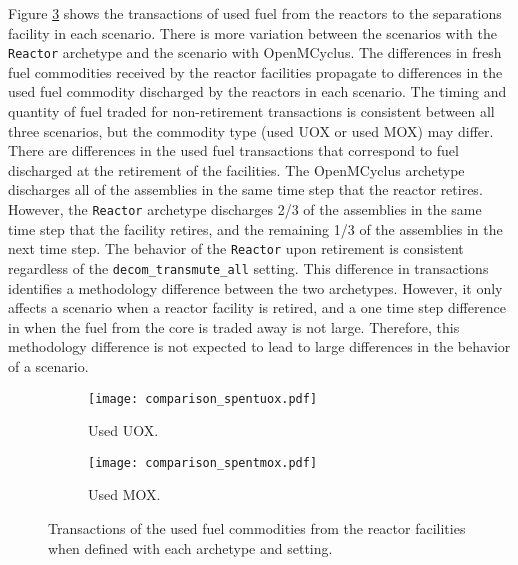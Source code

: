 Figure \ref{fig:comparison_spentfuel} shows the transactions of 
used fuel from the reactors to the separations facility in each 
scenario. There is more variation between the scenarios with the 
\Cycamore \texttt{Reactor} archetype and the scenario with OpenMCyclus. 
The differences in fresh fuel commodities received by the 
reactor facilities propagate to differences in the used fuel commodity 
discharged by the reactors in each scenario. The timing and quantity of 
fuel traded for non-retirement transactions is consistent between all 
three scenarios, but the commodity type (used \gls{UOX} or used \gls{MOX}) may 
differ. There are differences in the used fuel 
transactions that correspond to fuel discharged at the retirement of the 
facilities. The OpenMCyclus archetype discharges all of the assemblies 
in the same time step that the reactor retires. However, the \Cycamore 
\texttt{Reactor} archetype discharges 2/3 of the assemblies in the same 
time step that the facility retires, and the remaining 1/3 of the assemblies 
in the next time step. The behavior of the \Cycamore \texttt{Reactor} 
upon retirement is consistent regardless of the \texttt{decom\_transmute\_all}
setting. This difference in transactions identifies a methodology 
difference between the two archetypes. However, it only affects a 
scenario when a reactor facility is retired, and a one time step difference 
in when the fuel from the core is traded away is not large. Therefore, 
this methodology difference is not expected to lead to large differences 
in the behavior of a scenario. 

\begin{figure}[ht!]
    \centering
    \begin{subfigure}[b]{0.48\textwidth}
        \centering
        \texttt{[image: comparison\_spentuox.pdf]}
        \caption{Used UOX.}
        \label{fig:comparison_spentuox}
    \end{subfigure}
    \hfill
    \begin{subfigure}[b]{0.48\textwidth}
        \centering
        \texttt{[image: comparison\_spentmox.pdf]}
        \caption{Used MOX.}
        \label{fig:comparison_spentmox}
    \end{subfigure}
       \caption{Transactions of the used fuel commodities from the 
       reactor facilities when defined with each archetype and 
       setting.}
       \label{fig:comparison_spentfuel}
\end{figure}

